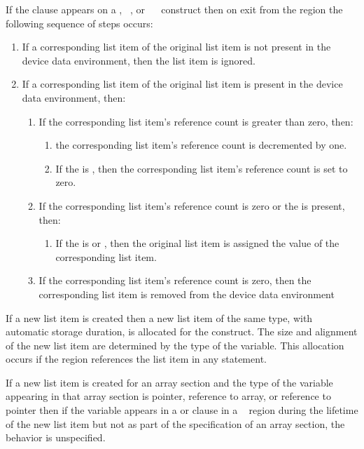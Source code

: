 If the  clause appears on a , ~, or ~~ construct then on exit from the region the following sequence of steps occurs:
\begin{enumerate}
\item If a corresponding list item of the original list item is not present in the device data environment, then the list item is ignored.
\item If a corresponding list item of the original list item is present in the device data environment, then:
\begin{enumerate}
\item If the corresponding list item's reference count is greater than zero, then:
\begin{enumerate}
\item the corresponding list item's reference count is decremented by one.
\item If the  is , then the corresponding list item's reference count is set to zero. 
\end{enumerate}
\item If the corresponding list item's reference count is zero or the   is present, then:
\begin{enumerate}
\item If the  is  or , then the original list item is assigned the value of the corresponding list item. 
\end{enumerate}
\item If the corresponding list item's reference count is zero, then the corresponding list item is removed from the device data environment 
\end{enumerate}
\end{enumerate}

\ccppspecificstart
If a new list item is created then a new list item of the same type, with automatic storage
duration, is allocated for the construct. The size and alignment of the new list
item are determined by the type of the variable. This allocation occurs if the region
references the list item in any statement.

If a new list item is created for an array section and the type of the variable appearing in that array section is pointer, reference to array, or reference to pointer then if the variable appears in a  or  clause in a ~ region during the lifetime of the new list item but not as part of the specification of an array section, the behavior is unspecified. 
\ccppspecificend

